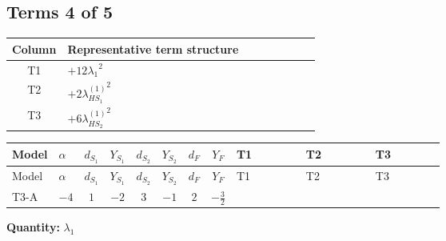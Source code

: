 \documentclass[8pt]{article}
\begin{document}
\begin{landscape}
\subsection*{Terms 4 of 5}
\begin{center}
\begin{tabular}{@{}c >{\raggedright\arraybackslash}p{0.82\linewidth}@{}}
\toprule
Column & Representative term structure \\
\midrule
T1 & \(\displaystyle +12 {\lambda_1}^2\) \\
\midrule
T2 & \(\displaystyle +2 {\lambda_{HS_1}^{(1)}}^2\) \\
\midrule
T3 & \(\displaystyle +6 {\lambda_{HS_2}^{(1)}}^2\) \\
\midrule
\bottomrule
\end{tabular}
\end{center}
\smallskip
\tiny
\begin{longtable}{@{}llcccccc >{\raggedright\arraybackslash}p{0.21\linewidth} >{\raggedright\arraybackslash}p{0.21\linewidth} >{\raggedright\arraybackslash}p{0.21\linewidth}@{}}
\toprule
Model & $\alpha$ & $d_{S_1}$ & $Y_{S_1}$ & $d_{S_2}$ & $Y_{S_2}$ & $d_F$ & $Y_F$ & T1 & T2 & T3 \\
\midrule
\endfirsthead
\toprule
Model & $\alpha$ & $d_{S_1}$ & $Y_{S_1}$ & $d_{S_2}$ & $Y_{S_2}$ & $d_F$ & $Y_F$ & T1 & T2 & T3 \\
\midrule
\endhead
T3-A & $-4$ & $1$ & $-2$ & $3$ & $-1$ & $2$ & $-\frac{3}{2}$ & \scriptsize\adjustbox{max width=\linewidth}{$\begin{gathered} +12 {\lambda_1}^2\end{gathered}$} & \scriptsize\adjustbox{max width=\linewidth}{$\begin{gathered} +2 {\lambda_{HS_1}^{(1)}}^2\end{gathered}$} & \scriptsize\adjustbox{max width=\linewidth}{$\begin{gathered} +6 {\lambda_{HS_2}^{(1)}}^2\end{gathered}$} \\
\midrule
\bottomrule
\end{longtable}
\clearpage
\noindent\textbf{Quantity: }$\lambda_1$\par\smallskip

\end{landscape}
\end{document}
